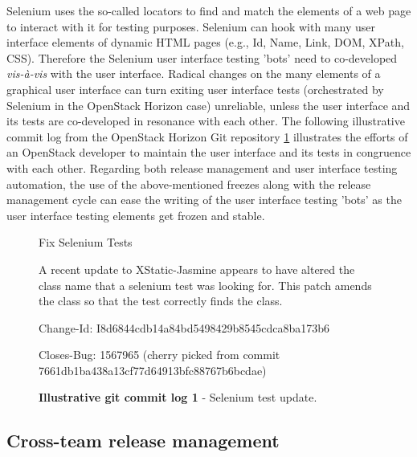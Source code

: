 \documentclass[dvipsnames]{bmcart}
\theoremstyle{definition}
\begin{document}

Selenium uses the so-called locators to find and match the elements of a web page to interact with it for testing purposes. Selenium can hook with many user interface elements of dynamic HTML pages (e.g., Id, Name, Link, DOM, XPath, CSS). Therefore the Selenium user interface testing 'bots' need to co-developed \textit{vis-à-vis} with the user interface. Radical changes on the many elements of a graphical user interface can turn exiting user interface tests (orchestrated by Selenium in the OpenStack Horizon case) unreliable,  unless the user interface and its tests are co-developed in resonance with each other. The following illustrative commit log from the OpenStack Horizon Git repository \hyperlink{hg1}{1} illustrates the efforts of an OpenStack developer to maintain the user interface and its tests in congruence with each other. Regarding both release management and user interface testing automation, the use of the above-mentioned freezes along with the release management cycle can ease the writing of the user interface testing 'bots' as the user interface testing elements get frozen and stable.



    
    \begin{figure}[h]
    \footnotesize
    \begin{numVblock}
 
    
 Fix Selenium Tests 
     
 A recent update to XStatic-Jasmine appears to have altered the class name
 that a selenium test was looking for. This patch amends the class so that 
 the test correctly finds the class. 
     
 Change-Id: I8d6844cdb14a84bd5498429b8545cdca8ba173b6 
     
 Closes-Bug: 1567965 
 (cherry picked from commit 7661db1ba438a13cf77d64913bfc88767b6bcdae)    
    \end{numVblock}
\raggedright{\sffamily  \par \textbf{\hypertarget{hg1}{Illustrative git commit log 1}} - Selenium test update. }
    \end{figure}



\subsection{Cross-team release management } 
\end{document}

